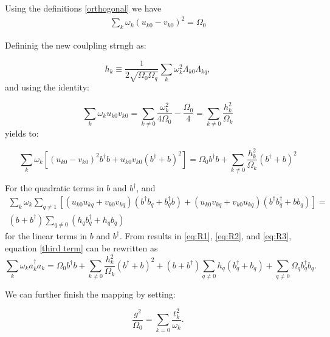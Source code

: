 \documentclass[%
preprint,
onecolumn,
notitlepag,
 amsmath,amssymb,
 aps,
 pra,
]{revtex4-2}
\begin{document}
Using  the definitions \eqref{orthogonal} we have
\begin{align}
     \sum_{k} \omega_{k} (u_{k0} - v_{k0})^2= \Omega_0
\end{align}

Defininig the new coulpling strngh as:

\begin{equation}
    h_{k} \equiv \frac{1}{2\sqrt{\Omega_{0} \Omega_{q}}} \sum_{k} \omega_{k}^{2} \Lambda_{k0}\Lambda_{kq},
\end{equation}
and using the identity:

\begin{equation}
\sum_k \omega_k u_{k0} v_{k0}= \sum_{k \neq 0} \frac{\omega_{k}^{2}}{4 \Omega_{0}}- \frac{\Omega_0}{4} = \sum_{k \neq 0} \frac{h_k^{2}}{\Omega_k}
\end{equation}
yields to:


\begin{equation}
\sum_{k} \omega_{k}\left[ \left(u_{k 0}-v_{k 0}\right)^2 b^{\dagger} b+u_{k 0} v_{k 0}\left(b^{\dagger}+b \right)^2 \right]   = \Omega_{0} b^{\dagger} b +   \sum_{k \neq 0} \frac{h_k^{2}}{\Omega_k} \left(b^{\dagger}+b \right)^2
 \label{eq:R2}
\end{equation}

For the quadratic terms in $b$ and $b^{\dagger}$, and 
\begin{multline}
 \sum_{k}\omega_{k} \sum_{q \neq 1 }\left[ (u_{k0 } u_{kq } + v_{k0 } v_{kq})( b^{\dagger} b_{q} + b_{q}^{\dagger} b)+ (u_{k0} v_{kq} + v_{k0} u_{kq}) ( b^{\dagger} b_{q}^{\dagger} + b b_{q}) \right] =\\ 
 (b + b^{\dagger}) \sum_{q\neq 0} (h_{q} b_{q}^{\dagger} + h_{q} b_{q}) 
 \label{eq:R3}
\end{multline}
for the linear terms in $b$ and $b^{\dagger}$.
From results in \eqref{eq:R1}, \eqref{eq:R2}, and \eqref{eq:R3}, equation \eqref{third term} can be rewritten as
\begin{equation}
    \sum_{k} \omega_{k} a_{k}^{\dagger} a_{k} = \Omega_{0} b^{\dagger} b +     \sum_{k \neq 0} \frac{h_k^{2}}{\Omega_k} \left(b^{\dagger}+b \right)^2
    + (b + b^{\dagger}) \sum_{q\neq 0} h_q ( b_{q}^{\dagger} + b_{q}) +  \sum_{q\neq 0} \Omega_{q} b_{q}^{\dagger} b_{q}.
\end{equation}

We can further finish the mapping by setting: 

\begin{equation}
    \frac{g^{2}}{\Omega_{0}}= \sum_{k=0} \frac{t_k ^2}{\omega_k}.
\end{equation}
\end{document}
